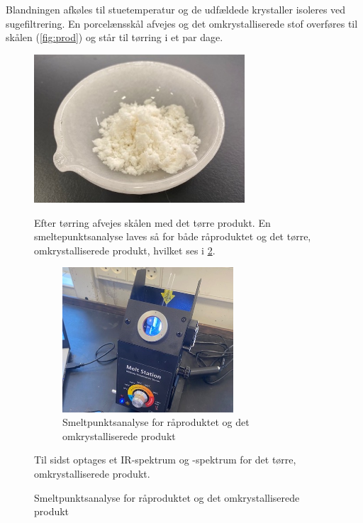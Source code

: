 \documentclass{report}
\begin{document}
Blandningen afkøles til stuetemperatur og de udfældede krystaller isoleres ved sugefiltrering. 
En porcelænsskål afvejes og det omkrystalliserede stof overføres til skålen (\cref{fig:prod}) og står til tørring i et par dage.
\begin{figure}[H]
\begin{center}
  \includegraphics[width=0.7\textwidth]{produkt.jpg}
\end{center}
\caption{Det omkrystalliserede stof i porcelænsskålen}
\label{fig:prod}
Efter tørring afvejes skålen med det tørre produkt.
En smeltepunktsanalyse laves så for både råproduktet og det tørre, omkrystalliserede produkt, hvilket ses i \cref{fig:smelt}.
\begin{figure}[H]
\begin{center}
  \includegraphics[width=0.7\textwidth]{smelt.jpg}
\end{center}
\caption{Smeltpunktsanalyse for råproduktet og det omkrystalliserede produkt}
\label{fig:smelt}
\end{figure}
Til sidst optages et IR-spektrum og -spektrum for det tørre, omkrystalliserede produkt.
\end{figure}
\end{document}
